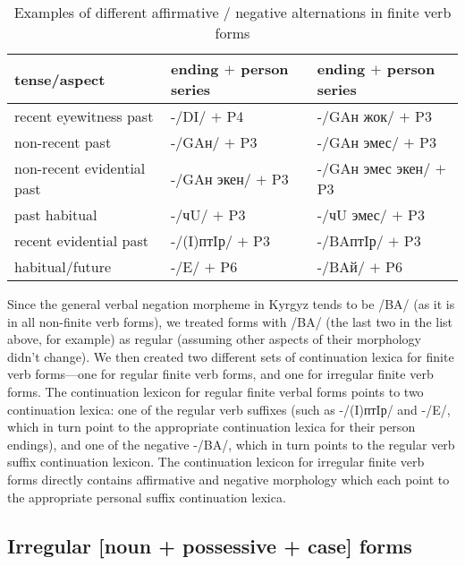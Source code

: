 \documentclass[10pt,a4paper,twocolumn]{article}
\begin{document}
\begin{table*}[htbp]
	\caption{Examples of different affirmative / negative alternations in finite verb forms}\label{irregnegs}
	\centering
	\begin{tabular}{lll}
		\toprule
		tense/aspect & ending $+$ person series & ending $+$ person series \\
		\midrule
		recent eyewitness past & -/DI/ $+$ P4\footnotemark{} & -/GAн жок/ $+$ P3\\
		non-recent past & -/GAн/ $+$ P3 & -/GAн эмес/ $+$ P3\\
		non-recent evidential past & -/GAн экен/ $+$ P3 & -/GAн эмес экен/ $+$ P3\\
		past habitual & -/чU/ $+$ P3 & -/чU эмес/ $+$ P3\\
		recent evidential past & -/(I)птIр/ $+$ P3 & -/BAптIр/ $+$ P3\\
		habitual/future & -/E/ $+$ P6 & -/BAй/ $+$ P6\\
		\bottomrule
	\end{tabular}
\end{table*}


Since the general verbal negation morpheme in Kyrgyz tends to be /BA/ (as it is in all non-finite verb forms), we treated forms with /BA/ (the last two in the list above, for example) as regular (assuming other aspects of their morphology didn’t change).  We then created two different sets of continuation lexica for finite verb forms—one for regular finite verb forms, and one for irregular finite verb forms.  The continuation lexicon for regular finite verbal forms points to two continuation lexica: one of the regular verb suffixes (such as -/(I)птIр/ and -/E/, which in turn point to the appropriate continuation lexica for their person endings), and one of the negative -/BA/, which in turn points to the regular verb suffix continuation lexicon.  The continuation lexicon for irregular finite verb forms directly contains affirmative and negative morphology which each point to the appropriate personal suffix continuation lexica.

\subsection{Irregular [noun + possessive + case] forms}
\end{document}
